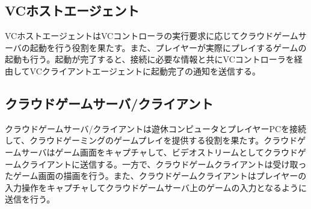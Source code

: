 \subsection{VCホストエージェント}
VCホストエージェントはVCコントローラの実行要求に応じてクラウドゲームサーバの起動を行う役割を果たす。また、プレイヤーが実際にプレイするゲームの起動も行う。起動が完了すると、接続に必要な情報と共にVCコントローラを経由してVCクライアントエージェントに起動完了の通知を送信する。

\subsection{クラウドゲームサーバ/クライアント}
クラウドゲームサーバ/クライアントは遊休コンピュータとプレイヤーPCを接続して、クラウドゲーミングのゲームプレイを提供する役割を果たす。クラウドゲームサーバはゲーム画面をキャプチャして、ビデオストリームとしてクラウドゲームクライアントに送信する。一方で、クラウドゲームクライアントは受け取ったゲーム画面の描画を行う。また、クラウドゲームクライアントはプレイヤーの入力操作をキャプチャしてクラウドゲームサーバ上のゲームの入力となるように送信を行う。


